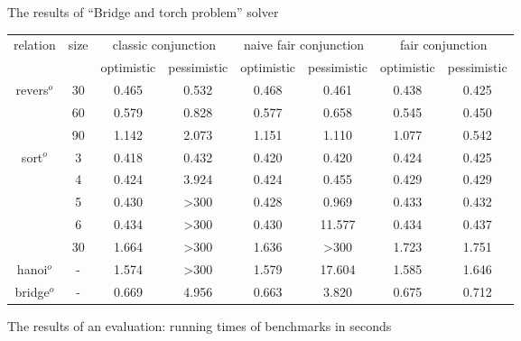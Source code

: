 \begin{figure}[h]
\centering
{}
\caption{The results of ``Bridge and torch problem'' solver}
\label{fair:plot-bridge}
\end{figure}

\begin{figure}[h]
  \small
  \centering
  \begin{tabular}{ c | c | c | c | c | c | c | c }
    \multirow{2}{*}{relation} & \multirow{2}{*}{size} & 
    \multicolumn{2}{c}{classic conjunction} &
    \multicolumn{2}{c}{naive fair conjunction} &
    \multicolumn{2}{c}{fair conjunction} \\
    \cline{3-8}
    & & optimistic & pessimistic & optimistic & pessimistic & optimistic & pessimistic  \\ 
    \hline
    \multirow{3}{*}{revers$^o$}
                 & 30   & 0.465 & 0.532 & 0.468 & 0.461  & 0.438 & 0.425 \\
                 & 60   & 0.579 & 0.828 & 0.577 & 0.658  & 0.545 & 0.450 \\
                 & 90   & 1.142 & 2.073 & 1.151 & 1.110  & 1.077 & 0.542 \\
    \hline
    \multirow{5}{*}{sort$^o$}
                 & 3    & 0.418 & 0.432 & 0.420 & 0.420  & 0.424 & 0.425 \\
                 & 4    & 0.424 & 3.924 & 0.424 & 0.455  & 0.429 & 0.429 \\
                 & 5    & 0.430 & >300  & 0.428 & 0.969  & 0.433 & 0.432 \\
                 & 6    & 0.434 & >300  & 0.430 & 11.577 & 0.434 & 0.437 \\
                 & 30   & 1.664 & >300  & 1.636 & >300   & 1.723 & 1.751 \\ 
    \hline
    hanoi$^o$    & -    & 1.574 & >300  & 1.579 & 17.604 & 1.585 & 1.646 \\
    \hline
    bridge$^o$   & -    & 0.669 & 4.956 & 0.663 & 3.820 & 0.675 & 0.712    

  \end{tabular}
  \caption{The results of an evaluation: running times of benchmarks in seconds}
  \label{fair:evaluation-table}
\end{figure}